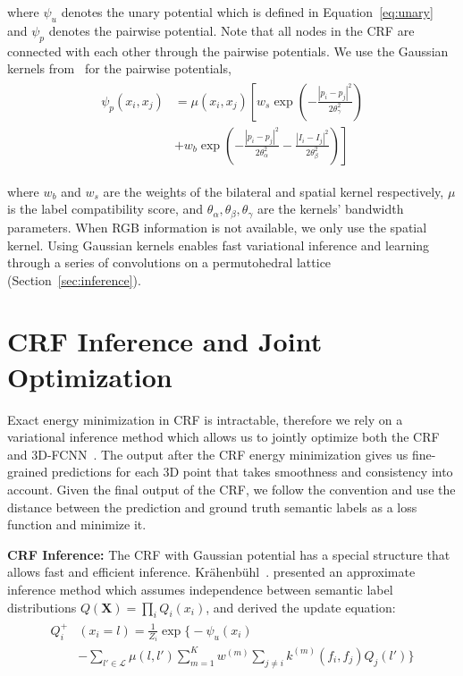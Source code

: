 \documentclass[10pt,twocolumn,letterpaper]{article}
\newcommand{\fccrf}[0]{CRF\xspace}
\newcommand{\threedfcnn}[0]{3D-FCNN\xspace}
\begin{document}
where $\psi_u$ denotes the unary potential which is defined in Equation~\ref{eq:unary} and $\psi_p$ denotes the pairwise potential. Note that all nodes in the \fccrf are connected with each other through the pairwise potentials. We use the Gaussian kernels from~\cite{denseCRF} for the pairwise potentials,
\vspace{-2mm}
\begin{align}
\begin{split}
    \psi_p(x_i,x_j) & = \mu(x_i,x_j) \left[ w_s \exp{ \left( - \frac{|p_i - p_j|^2}{2\theta^2_\gamma} \right) } \right. \\
    & \left. + w_b \exp{ \left(- \frac{|p_i - p_j|^2}{2\theta^2_\alpha} - \frac{|I_i - I_j|^2}{2\theta^2_\beta} \right)} \right]
\end{split}
\end{align}

where $w_b$ and $w_s$ are the weights of the bilateral and spatial kernel respectively, $\mu$ is the label compatibility score, and $\theta_\alpha, \theta_\beta, \theta_\gamma$ are the kernels' bandwidth parameters. When RGB information is not available, we only use the spatial kernel. Using Gaussian kernels enables fast variational inference and learning through a series of convolutions on a permutohedral lattice~\cite{permutohedral_convolution} (Section~\ref{sec:inference}).  
\section{\fccrf Inference and Joint Optimization} \label{sec:joint}
Exact energy minimization in \fccrf is intractable, therefore we rely on a variational inference method which allows us to jointly optimize both the \fccrf and \threedfcnn~\cite{Zheng2015,denseCRF}. The output after the \fccrf energy minimization gives us fine-grained predictions for each 3D point that takes smoothness and consistency into account. Given the final output of the \fccrf, we follow the convention and use the distance between the prediction and ground truth semantic labels as a loss function and minimize it.


\noindent\textbf{\fccrf Inference:} \label{sec:inference}
The \fccrf with Gaussian potential has a special structure that allows fast and efficient inference.  Kr\"{a}henb\"{u}hl~\etal. \cite{denseCRF} presented an approximate inference method which assumes independence between semantic label distributions $Q(\mathbf{X}) = \prod\limits_i
Q_i(x_i)$, and derived the update equation:
\vspace{-2mm}
\begin{align}
\begin{split}
    Q_i^+ & (x_i = l)  = \frac{1}{Z_i} \exp\Big\{ - \psi_u(x_i) \\
        & - \sum_{l' \in \mathcal{L}}\mu(l, l') \sum_{m=1}^K w^{(m)} \sum_{j \neq i} k^{(m)} (f_i, f_j) Q_j(l')\Big\}
\end{split}
\end{align}
\end{document}
